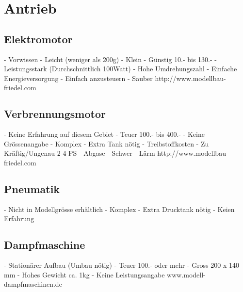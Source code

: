 \section{Antrieb}

\subsection{Elektromotor}
- Vorwissen
- Leicht (weniger als 200g)
- Klein
- Günstig 10.- bis 130.-
- Leistungsstark (Durchschnittlich 100Watt)
- Hohe Umdrehungszahl
- Einfache Energieversorgung
- Einfach anzusteuern
- Sauber
http://www.modellbau-friedel.com


\subsection{Verbrennungsmotor}
- Keine Erfahrung auf diesem Gebiet
- Teuer 100.- bis 400.-
- Keine Grössenangabe
- Komplex
- Extra Tank nötig
- Treibstoffkosten
- Zu Kräftig/Ungenau 2-4 PS
- Abgase
- Schwer
- Lärm
http://www.modellbau-friedel.com

\subsection{Pneumatik}
- Nicht in Modellgrösse erhältlich
- Komplex
- Extra Drucktank nötig
- Keien Erfahrung



\subsection{Dampfmaschine}
- Stationärer Aufbau (Umbau nötig)
- Teuer 100.- oder mehr
- Gross 200 x 140 mm
- Hohes Gewicht ca. 1kg
- Keine Leistungsangabe
www.modell-dampfmaschinen.de
